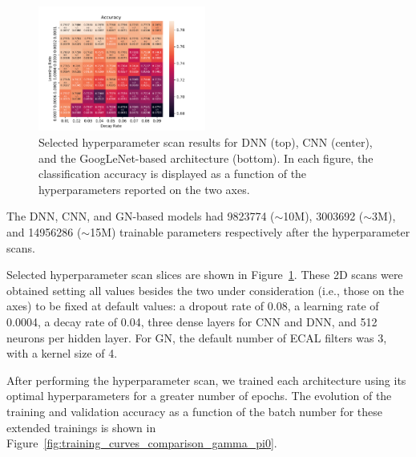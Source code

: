 \begin{figure}[htbp]
\includegraphics[width=0.49\textwidth]{Images/Calo/GN_lr_dr.pdf}
\caption{Selected hyperparameter scan results for DNN (top), CNN (center), and the GoogLeNet-based architecture (bottom). In each figure, the classification accuracy is displayed as a function of the hyperparameters reported on the two axes.}
\label{fig:scan_hyperparameter}
\end{figure}

The DNN, CNN, and GN-based models had 9823774 ($\sim$10M), 3003692 ($\sim$3M), and 14956286 ($\sim$15M) trainable parameters respectively after the hyperparameter scans.

Selected hyperparameter scan slices are shown in Figure~\ref{fig:scan_hyperparameter}. 
These 2D scans were obtained setting all values besides the two under consideration (i.e., those on the axes) to be fixed at default values: a dropout rate of 0.08, a learning rate of 0.0004, a decay rate of 0.04, three dense layers for CNN and DNN, and 512 neurons per hidden layer. For GN, the default number of ECAL filters was 3, with a kernel size of 4.

After performing the hyperparameter scan, we trained each architecture using its optimal hyperparameters for a greater number of epochs. The evolution of the training and validation accuracy as a function of the batch number for these extended trainings is shown in Figure~\ref{fig:training_curves_comparison_gamma_pi0}.


